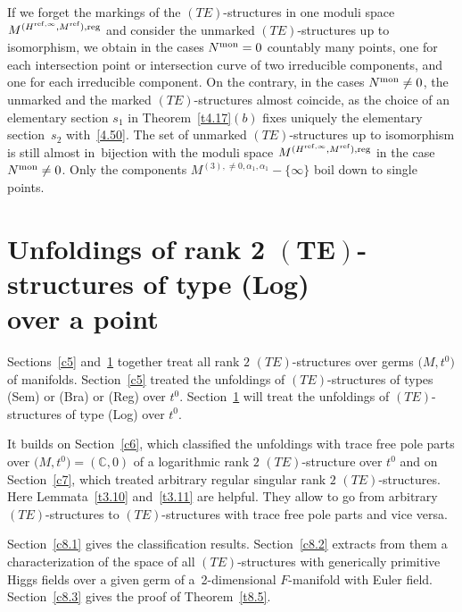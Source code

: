 \documentclass[10pt,a4paper]{amsart}
\numberwithin{equation}{section}
\numberwithin{figure}{section}
\newcommand{\C}{{\mathbb C}}
\begin{document}
{\sloppy\begin{Remark}%
If we forget the markings of the $(TE)$-structures in one
moduli space $M^{(H^{{\rm ref},\infty},M^{\rm ref}),{\rm reg}}$
and consider the unmarked $(TE)$-structures up to isomorphism,
we obtain in the cases $N^{\rm mon}=0$ countably many
points, one for each intersection point or intersection
curve of two irreducible components,
and one for each irreducible component.
On the contrary, in the cases $N^{\rm mon}\neq 0$,
the unmarked and the marked $(TE)$-structures almost coincide,
as the choice of an elementary section $s_1$ in
Theorem~\ref{t4.17}$(b)$ fixes uniquely the elementary
section~$s_2$ with~\eqref{4.50}.
The set of unmarked $(TE)$-structures up to isomorphism
is still almost in~bijec\-tion with the moduli space
$M^{(H^{{\rm ref},\infty},M^{\rm ref}),{\rm reg}}$ in the case $N^{\rm mon}\neq0$.
Only the components $M^{(3),\neq 0,\alpha_1,\alpha_1}-\{\infty\}$
boil down to single points.
\end{Remark}

}

\section[Unfoldings of rank 2 $(TE)$-structures of type (Log) over a point]
{Unfoldings of rank 2 $\boldsymbol{(TE)}$-structures of type (Log) \\over a point}\label{c8}

Sections~\ref{c5} and~\ref{c8} together
treat all rank $2$ $(TE)$-structures over germs $\big(M,t^0\big)$ of
manifolds. Section~\ref{c5} treated the unfoldings
of $(TE)$-structures of types (Sem) or (Bra) or (Reg)
over $t^0$.
Section~\ref{c8} will treat the unfoldings of
$(TE)$-structures of type (Log) over $t^0$.

It builds on Section~\ref{c6}, which classified the
unfoldings with trace free pole parts over
$\big(M,t^0\big)=(\C,0)$ of a logarithmic rank $2$ $(TE)$-structure
over $t^0$ and on Section~\ref{c7},
which treated arbitrary regular singular rank $2$
$(TE)$-structures.
Here Lemmata~\ref{t3.10} and~\ref{t3.11} are helpful.
They allow to go from arbitrary $(TE)$-structures
to $(TE)$-structures with trace free pole parts
and vice versa.

Section~\ref{c8.1} gives the classification results.
Section~\ref{c8.2} extracts from them a
characterization of the space of all $(TE)$-structures
with generically primitive Higgs fields over a given
germ of a~2-dimensional $F$-manifold with Euler field.
Section~\ref{c8.3} gives the proof of Theorem~\ref{t8.5}.
\end{document}
